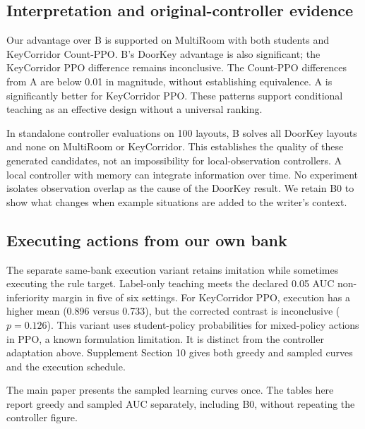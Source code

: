 \subsection{Interpretation and original-controller evidence}
Our advantage over B is supported on MultiRoom with both students and
KeyCorridor Count-PPO. B's DoorKey advantage is also significant; the
KeyCorridor PPO difference remains inconclusive. The Count-PPO differences
from A are below 0.01 in magnitude, without establishing equivalence.
A is significantly better for KeyCorridor PPO. These patterns support
conditional teaching as an effective design without a universal ranking.

In standalone controller evaluations on 100 layouts, B solves all DoorKey
layouts and none on MultiRoom or KeyCorridor. This establishes the quality
of these generated candidates, not an impossibility for local-observation
controllers. A local controller with memory can integrate information over
 time. No experiment isolates observation overlap as the cause of the
DoorKey result. We retain B0 to show what changes when example situations
are added to the writer's context.



\subsection{Executing actions from our own bank}
The separate same-bank execution variant retains imitation while sometimes
executing the rule target. Label-only teaching meets the declared 0.05 AUC
non-inferiority margin in five of six settings. For KeyCorridor PPO,
execution has a higher mean (0.896 versus 0.733), but the corrected contrast
is inconclusive ($p=0.126$). This variant uses student-policy probabilities
for mixed-policy actions in PPO, a known formulation limitation. It is
distinct from the controller adaptation above. Supplement Section 10 gives
both greedy and sampled curves and the execution schedule.


The main paper presents the sampled learning curves once. The tables here
report greedy and sampled AUC separately, including B0, without repeating
the controller figure.
